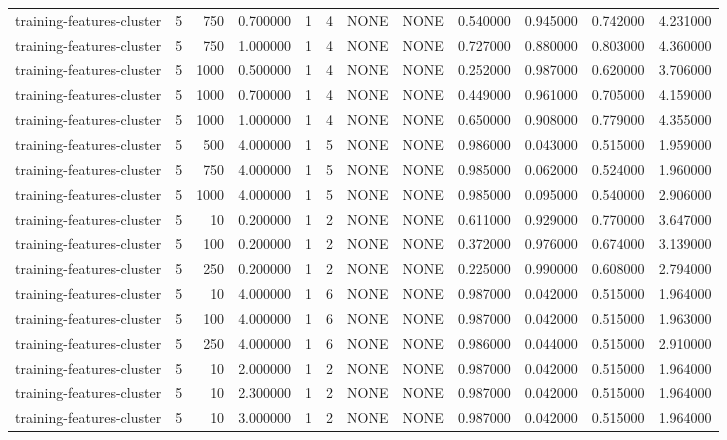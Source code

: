 \begin{tabular}{lrrrllllrrrr}
training-features-cluster & 5 & 750 & 0.700000 & 1 & 4 & NONE & NONE & 0.540000 & 0.945000 & 0.742000 & 4.231000 \\
training-features-cluster & 5 & 750 & 1.000000 & 1 & 4 & NONE & NONE & 0.727000 & 0.880000 & 0.803000 & 4.360000 \\
training-features-cluster & 5 & 1000 & 0.500000 & 1 & 4 & NONE & NONE & 0.252000 & 0.987000 & 0.620000 & 3.706000 \\
training-features-cluster & 5 & 1000 & 0.700000 & 1 & 4 & NONE & NONE & 0.449000 & 0.961000 & 0.705000 & 4.159000 \\
training-features-cluster & 5 & 1000 & 1.000000 & 1 & 4 & NONE & NONE & 0.650000 & 0.908000 & 0.779000 & 4.355000 \\
training-features-cluster & 5 & 500 & 4.000000 & 1 & 5 & NONE & NONE & 0.986000 & 0.043000 & 0.515000 & 1.959000 \\
training-features-cluster & 5 & 750 & 4.000000 & 1 & 5 & NONE & NONE & 0.985000 & 0.062000 & 0.524000 & 1.960000 \\
training-features-cluster & 5 & 1000 & 4.000000 & 1 & 5 & NONE & NONE & 0.985000 & 0.095000 & 0.540000 & 2.906000 \\
training-features-cluster & 5 & 10 & 0.200000 & 1 & 2 & NONE & NONE & 0.611000 & 0.929000 & 0.770000 & 3.647000 \\
training-features-cluster & 5 & 100 & 0.200000 & 1 & 2 & NONE & NONE & 0.372000 & 0.976000 & 0.674000 & 3.139000 \\
training-features-cluster & 5 & 250 & 0.200000 & 1 & 2 & NONE & NONE & 0.225000 & 0.990000 & 0.608000 & 2.794000 \\
training-features-cluster & 5 & 10 & 4.000000 & 1 & 6 & NONE & NONE & 0.987000 & 0.042000 & 0.515000 & 1.964000 \\
training-features-cluster & 5 & 100 & 4.000000 & 1 & 6 & NONE & NONE & 0.987000 & 0.042000 & 0.515000 & 1.963000 \\
training-features-cluster & 5 & 250 & 4.000000 & 1 & 6 & NONE & NONE & 0.986000 & 0.044000 & 0.515000 & 2.910000 \\
training-features-cluster & 5 & 10 & 2.000000 & 1 & 2 & NONE & NONE & 0.987000 & 0.042000 & 0.515000 & 1.964000 \\
training-features-cluster & 5 & 10 & 2.300000 & 1 & 2 & NONE & NONE & 0.987000 & 0.042000 & 0.515000 & 1.964000 \\
training-features-cluster & 5 & 10 & 3.000000 & 1 & 2 & NONE & NONE & 0.987000 & 0.042000 & 0.515000 & 1.964000 \\

\end{tabular}
